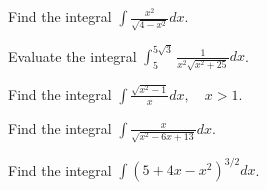 \documentclass[
  course = {{MATH102 Calculus II}},
  quartile = {{2}},
  assignment = 12,%
  topic = {{7.3: Trigonometric Substitution}},
  firstexercise = 1,
  term = 202
]{aga-homework}
\begin{document}
\fbox{
\begin{minipage}{\textwidth}

\mbox{}

\vspace{1mm}

\[
\displaystyle
\text{For },\sqrt{a^2-x^2}, \quad \text{ use } \quad x = a\sin\theta, \quad 0\leq \theta \leq \pi.
\]
\vspace{1mm}

\[
\displaystyle
\text{For },\sqrt{a^2+x^2}, \quad \text{ use } \quad x = a\tan\theta, \quad -\frac{\pi}{2}< \theta <\frac{\pi}{2}.
\]
\vspace{1mm}


\[
\displaystyle
\text{For },\sqrt{x^2-a^2}, \quad \text{ use } \quad x = a\sec\theta, \quad 0\leq \theta < \frac{\pi}{2} \text{ or }\pi \leq \theta <\frac{3\pi}{2}.
\]
\vspace{1mm}
\end{minipage}
}

\newpage

\problem Find the integral $\displaystyle \int \frac{x^2}{\sqrt{4-x^2}} dx $.

\newpage

\problem Evaluate the integral $\displaystyle \int_{5}^{5\sqrt{3}} \frac{1}{x^2\sqrt{x^2+25}} dx $.

\newpage

\problem Find the integral $\displaystyle \int \frac{\sqrt{x^2-1}}{x} dx,\quad x>1 $.

\newpage

\problem Find the integral $\displaystyle \int \frac{x}{\sqrt{x^2-6x+13}} dx $.

\newpage

\problem Find the integral $\displaystyle \int (5+4x-x^2)^{3/2} dx $.

\afterpage{\null\newpage}

\afterpage{\null\newpage}

\afterpage{\null\newpage}
\end{document}
